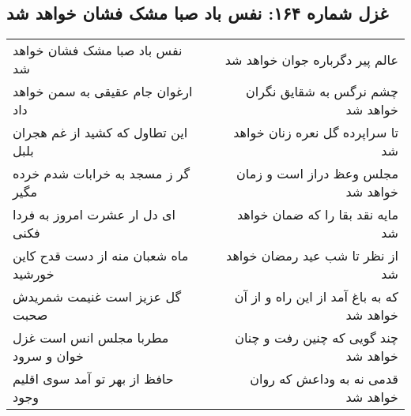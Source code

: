 \begin{center}
\section*{غزل شماره ۱۶۴: نفس باد صبا مشک فشان خواهد شد}
\label{sec:sh164}
\begin{longtable}{l p{0.5cm} r}
نفس باد صبا مشک فشان خواهد شد
&&
عالم پیر دگرباره جوان خواهد شد
\\
ارغوان جام عقیقی به سمن خواهد داد
&&
چشم نرگس به شقایق نگران خواهد شد
\\
این تطاول که کشید از غم هجران بلبل
&&
تا سراپرده گل نعره زنان خواهد شد
\\
گر ز مسجد به خرابات شدم خرده مگیر
&&
مجلس وعظ دراز است و زمان خواهد شد
\\
ای دل ار عشرت امروز به فردا فکنی
&&
مایه نقد بقا را که ضمان خواهد شد
\\
ماه شعبان منه از دست قدح کاین خورشید
&&
از نظر تا شب عید رمضان خواهد شد
\\
گل عزیز است غنیمت شمریدش صحبت
&&
که به باغ آمد از این راه و از آن خواهد شد
\\
مطربا مجلس انس است غزل خوان و سرود
&&
چند گویی که چنین رفت و چنان خواهد شد
\\
حافظ از بهر تو آمد سوی اقلیم وجود
&&
قدمی نه به وداعش که روان خواهد شد
\\
\end{longtable}
\end{center}
